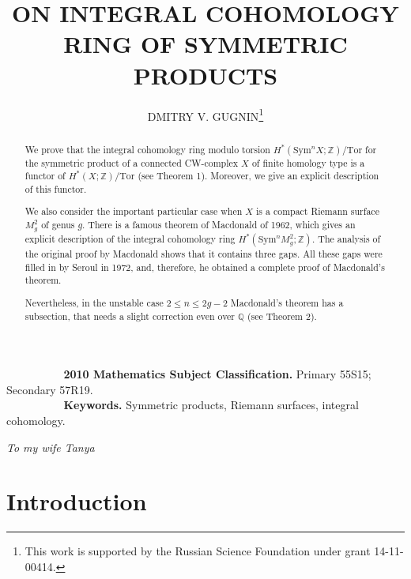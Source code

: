 \documentclass[a4paper,14pt]{article}
\author{DMITRY V. GUGNIN\thanks{This work is supported by the Russian Science Foundation under grant 14-11-00414.}}
\title{\bf \large ON INTEGRAL COHOMOLOGY RING OF SYMMETRIC PRODUCTS}
\date{}
\newcommand{\Sym}{\mathrm{Sym}}
\newcommand{\Tor}{\mathrm{Tor}}
\newcommand{\Q}{\mathbb{Q}}
\newcommand{\Z}{\mathbb{Z}}
\begin{document}
\pagestyle{plain}


\maketitle





\begin{abstract}

We prove that the integral cohomology ring modulo torsion $H^*(\Sym^n X;\Z)/\Tor$ for the symmetric product of a connected CW-complex $X$ of finite homology type is a functor of $H^*(X;\Z)/\Tor$ (see Theorem 1). Moreover, we give an explicit description of this functor.

We also consider the important particular case when $X$ is a compact Riemann surface $M^2_g$ of genus $g$. There is a famous theorem of Macdonald of 1962, which gives an explicit description of the integral cohomology ring $H^*(\Sym^n M^2_g;\Z)$. The analysis of the original proof by Macdonald shows that it contains three gaps. All these gaps were filled in by Seroul in 1972, and, therefore, he obtained a complete proof of Macdonald's theorem.  

Nevertheless, in the unstable case $2\le n\le 2g-2$ Macdonald's theorem has a subsection, that needs a slight correction even over $\Q$ (see Theorem 2). 

\end{abstract}



\begin{flushleft}

\textbf{ \ \ \ \ \ \ \ \ \  2010 Mathematics Subject Classification.}  Primary 55S15; Secondary 57R19. \\

\textbf{ \ \ \ \ \ \ \ \ \  Keywords.} Symmetric products, Riemann surfaces, integral cohomology. 

\end{flushleft}

\medskip






\begin{flushright}
{\it \large To my wife Tanya}
\end{flushright}





\section{Introduction}
\end{document}
